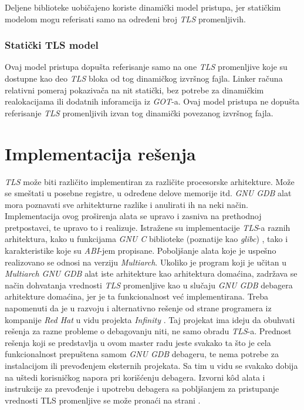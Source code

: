 \documentclass[12pt,oneside]{memoir}
\begin{document}
Deljene biblioteke uobičajeno koriste dinamički model pristupa, jer statičkim modelom mogu referisati samo na određeni broj \emph{TLS} promenljivih.

\subsection{Statički TLS model}

Ovaj model pristupa dopušta referisanje samo na one \emph{TLS} promenljive koje su dostupne kao deo \emph{TLS} bloka od tog dinamičkog izvršnog fajla. Linker računa relativni pomeraj pokazivača na nit statički, bez potrebe za dinamičkim realokacijama ili dodatnih inforamcija iz \emph{GOT}-a. Ovaj model pristupa ne dopušta referisanje \emph{TLS} promenljivih izvan tog dinamički povezanog izvršnog fajla.

\chapter{Implementacija rešenja}
\label{chp:Implementacija}

\emph{TLS} može biti različito implementiran za različite procesorske arhitekture. Može se smeštati u posebne registre, u određene delove memorije itd. \emph{GNU GDB} alat mora poznavati sve arhitekturne razlike i anulirati ih na neki način. Implementacija ovog proširenja alata se upravo i zasniva na prethodnoj pretpostavci, te upravo to i realizuje. Istražene su implementacije \emph{TLS}-a raznih arhitektura, kako u funkcijama \emph{GNU C} biblioteke (poznatije kao \emph{glibc}) \cite{GLIBC}, tako i karakteristike koje su \emph{ABI}-jem propisane. Poboljšanje alata koje je uspešno realizovano se odnosi na verziju \emph{Multiarch}. Ukoliko je program koji je učitan u \emph{Multiarch GNU GDB} alat iste arhitekture kao arhitektura domaćina, zadržava se način dohvatanja vrednosti \emph{TLS} promenljive kao u slučaju \emph{GNU GDB} debagera arhitekture domaćina, jer je ta funkcionalnost već implementirana. Treba napomenuti da je u razvoju i alternativno rešenje od strane programera iz kompanije \emph{Red Hat} \cite{REDHAT} u vidu projekta \emph{Infinity} \cite{Infinity}. Taj projekat ima ideju da obuhvati rešenja za razne probleme o debagovanju niti, ne samo obradu \emph{TLS}-a. Prednost rešenja koji se predstavlja u ovom master radu jeste svakako ta što je cela funkcionalnost prepuštena samom \emph{GNU GDB} debageru, te nema potrebe za instalacijom ili prevođenjem eksternih projekata. Sa tim u vidu se svakako dobija na uštedi korisničkog napora pri korišćenju debagera. Izvorni k\^{o}d alata i instrukcije za prevođenje i upotrebu debagera sa pobljšanjem za pristupanje vrednosti TLS promenljive se može pronaći na strani \cite{GITMOJ}.
\end{document}
